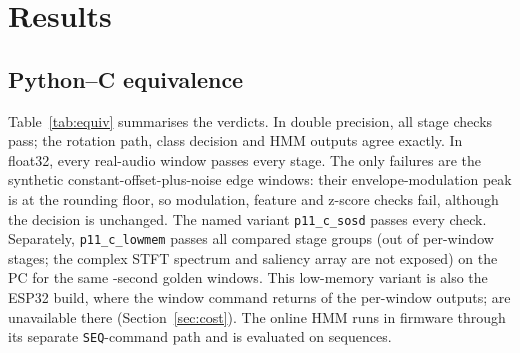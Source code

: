 \documentclass[conference]{IEEEtran}
\newif\ifwip
\begin{document}
\section{Results}
\label{sec:results}

\subsection{Python--C equivalence}

\ifwip
Table~\ref{tab:equiv} summarises the verdicts. In double precision all \VEqStagesTotal{}
stage checks pass on all windows and sequence configurations; the rotation path, the decision and
every HMM output agree exactly. In float32 all \VEqRealCases{} windows of real audio pass every
stage. The failures are confined to the \VEqFloatBadCases{} synthetic constant-offset-plus-noise
windows, whose modulation spectrum lies at the float32 rounding floor in both implementations, so
the peak location is undetermined (the reference peak is \VEqDcRefPeakRatio{} times the reference
power at the bin chosen by the C code: not a tie). We count the modulation, feature and z-score
checks as failed there (\VEqFloatStagesPassStrict{} of \VEqStagesTotal{} checks pass on all
windows); the class decision agrees on \VEqFloatDecisionPass{} of \VEqCases{} windows. The named
variant \texttt{p11\_c\_sosd} passes every check. An independent audit reproduced the comparison
from a clean build; its corrections are applied here. These are PC results; the comparison on the
chip is in Section~\ref{sec:cost}.
\else
Table~\ref{tab:equiv} summarises the verdicts. In double precision, all \VEqStagesTotal{} stage
checks pass; the rotation path, class decision and HMM outputs agree exactly. In float32, every
real-audio window passes every stage. The only failures are the \VEqFloatBadCases{} synthetic
constant-offset-plus-noise edge windows: their envelope-modulation peak is at the rounding floor,
so modulation, feature and z-score checks fail, although the decision is unchanged. The named
variant \texttt{p11\_c\_sosd} passes every check. Separately, \texttt{p11\_c\_lowmem} passes all
\VEqLmStagesPass{} compared stage groups (out of \VEqStagesCase{} per-window stages; the complex
STFT spectrum and saliency array are not exposed) on the PC for the same \VEqLmCases{} \VParSegBldc{}-second
golden windows. This low-memory variant is also the ESP32 build, where the
window command returns \VChipEqStages{} of the \VEqStagesCase{} per-window outputs;
\VChipEqStagesAbsent{} are unavailable there (Section~\ref{sec:cost}). The online HMM runs in
firmware through its separate \texttt{SEQ}-command path and is evaluated on sequences.
\fi
\end{document}

